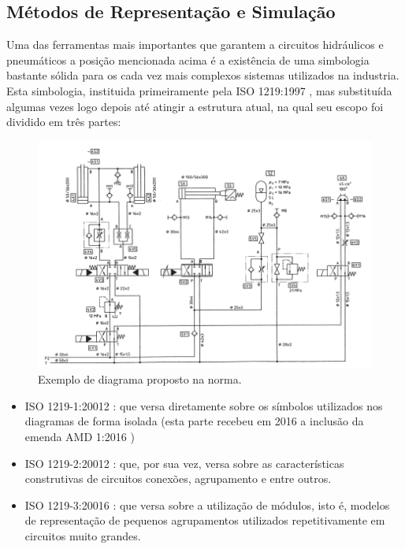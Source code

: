 \subsection{Métodos de Representação e Simulação}

Uma das ferramentas mais importantes que garantem a circuitos hidráulicos e pneumáticos a posição mencionada acima é a 
existência de uma simbologia bastante sólida para os cada vez mais complexos sistemas utilizados na industria. Esta simbologia,
instituida primeiramente pela ISO 1219:1997 \cite{ISO1219:1997}, mas substituída algumas vezes logo depois até atingir a
estrutura atual, na qual seu escopo foi dividido em três partes:

\begin{figure}[htb]
    \begin{center}
	    \includegraphics[scale=0.5]{figs/std-example.png}
	\end{center}
	\caption{Exemplo de diagrama proposto na norma.} 
\end{figure}

\begin{itemize}

    \item ISO 1219-1:20012 \cite{ISO1219-1:2012}: que versa diretamente sobre os símbolos utilizados nos diagramas de 
    forma isolada (esta parte recebeu em 2016 a inclusão da emenda AMD 1:2016 \cite{ISO1219-1:2012/AMD-1:2016}) 
    \item ISO 1219-2:20012 \cite{ISO1219-2:2012}: que, por sua vez, versa sobre as características construtivas de 
    circuitos conexões, agrupamento e entre outros. 
    \item ISO 1219-3:20016 \cite{ISO1219-3:2016}: que versa sobre a utilização de módulos, isto é, modelos de representação
    de pequenos agrupamentos utilizados repetitivamente em circuitos muito grandes.

\end{itemize}

